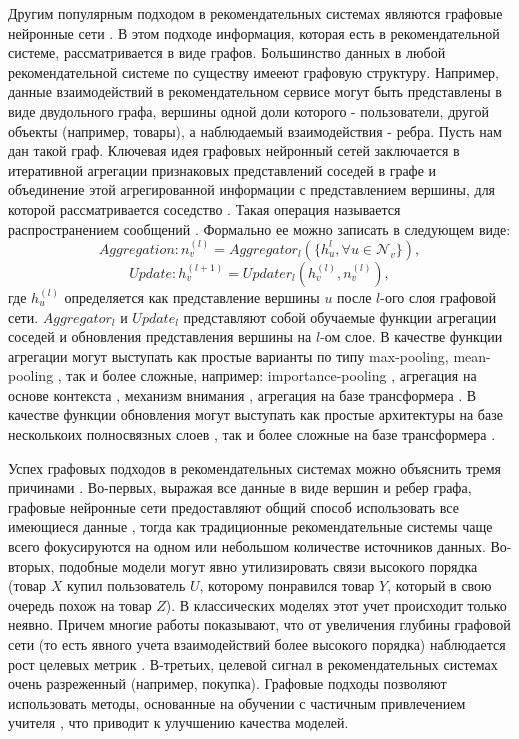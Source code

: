 \documentclass{article}
\begin{document}
Другим популярным подходом в рекомендательных системах являются графовые нейронные 
сети \cite{lightgcn,lightgcl,hetergcl,herograph,slgcn}. В этом подходе информация, которая есть в рекомендательной 
системе, рассматривается в виде графов. Большинство данных в любой рекомендательной системе по
существу имееют графовую структуру. Например, данные взаимодействий в рекомендательном сервисе могут быть
представлены в виде двудольного графа, вершины одной доли которого - пользователи, другой объекты (например, товары), а
наблюдаемый взаимодействия - ребра. Пусть нам дан такой граф. Ключевая идея графовых нейронный сетей заключается в
итеративной агрегации признаковых представлений соседей в графе и объединение этой агрегированной информации
с представлением вершины, для которой рассматривается соседство \cite{survey1}. Такая операция называется распространением
сообщений \cite{lightgcn,sage}. Формально ее можно записать в следующем виде:$$
Aggregation: n^{(l)}_v = Aggregator_l(\{h^l_u, \forall u \in \mathcal{N}_v\}),$$$$Update: h^{(l + 1)}_v = Updater_l(h_v^{(l)}, n_v^{(l)}),
$$ где $h_u^{(l)}$ определяется как представление вершины $u$ после $l$-ого слоя графовой сети. $Aggregator_l$ и $Update_l$
представляют собой обучаемые функции агрегации соседей и обновления представления вершины на $l$-ом слое. В качестве функции 
агрегации могут выступать как простые варианты по типу max-pooling, mean-pooling \cite{sage}, так и более сложные, например: 
importance-pooling \cite{pinsage}, агрегация на основе контекста \cite{multisage}, механизм внимания \cite{gat}, агрегация
на базе трансформера \cite{multibisage}. В качестве функции обновления могут выступать как простые архитектуры на базе несколькоих
полносвязных слоев \cite{sage, pinsage}, так и более сложные на базе трансформера \cite{multibisage}.

Успех графовых подходов в рекомендательных системах можно объяснить тремя причинами \cite{survey2}. Во-первых,
выражая все данные в виде вершин и ребер графа, графовые нейронные сети предоставляют общий способ
использовать все имеющиеся данные \cite{twhin}, тогда как традиционные рекомендательные системы чаще
всего фокусируются на одном или небольшом количестве источников данных. Во-вторых, подобные модели могут явно
утилизировать связи высокого порядка (товар $X$ купил пользователь $U$, которому понравился товар $Y$, который в свою очередь
похож на товар $Z$). В классических моделях этот учет происходит только неявно. Причем многие работы показывают, что от увеличения
глубины графовой сети (то есть явного учета взаимодействий более высокого порядка) наблюдается рост целевых 
метрик \cite{lightgcn,sage,podcastgnn}. В-третьих, целевой сигнал в рекомендательных системах очень 
разреженный (например, покупка). Графовые подходы позволяют использовать методы, основанные на обучении с частичным 
привлечением учителя \cite{semisupervised}, что приводит к улучшению качества моделей.
\end{document}
